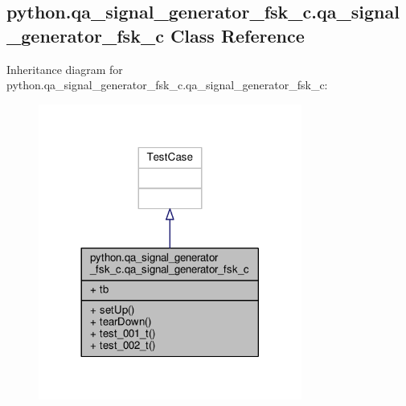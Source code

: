 \subsection{python.\+qa\+\_\+signal\+\_\+generator\+\_\+fsk\+\_\+c.\+qa\+\_\+signal\+\_\+generator\+\_\+fsk\+\_\+c Class Reference}
\label{classpython_1_1qa__signal__generator__fsk__c_1_1qa__signal__generator__fsk__c}


Inheritance diagram for python.\+qa\+\_\+signal\+\_\+generator\+\_\+fsk\+\_\+c.\+qa\+\_\+signal\+\_\+generator\+\_\+fsk\+\_\+c\+:
\nopagebreak
\begin{figure}[H]
\begin{center}
\leavevmode
\includegraphics[width=245pt]{d1/dd6/classpython_1_1qa__signal__generator__fsk__c_1_1qa__signal__generator__fsk__c__inherit__graph}
\end{center}
\end{figure}


